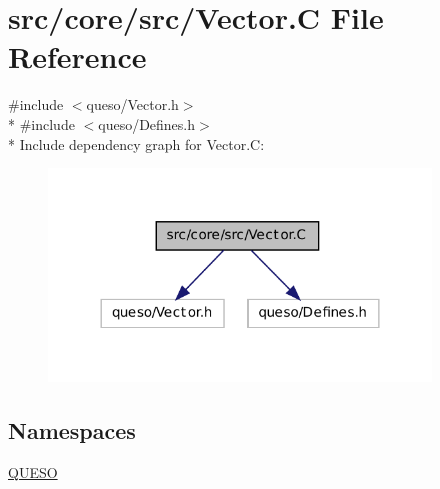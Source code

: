 \hypertarget{_vector_8_c}{\section{src/core/src/\-Vector.C File Reference}
\label{_vector_8_c}
}
{\ttfamily \#include $<$queso/\-Vector.\-h$>$}\\*
{\ttfamily \#include $<$queso/\-Defines.\-h$>$}\\*
Include dependency graph for Vector.\-C\-:
\nopagebreak
\begin{figure}[H]
\begin{center}
\leavevmode
\includegraphics[width=288pt]{_vector_8_c__incl}
\end{center}
\end{figure}
\subsection*{Namespaces}
\begin{DoxyCompactItemize}
\item 
\hyperlink{namespace_q_u_e_s_o}{Q\-U\-E\-S\-O}
\end{DoxyCompactItemize}
